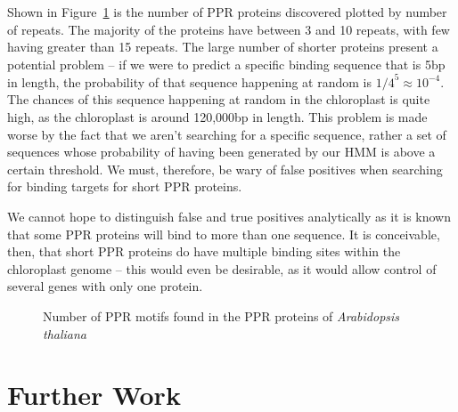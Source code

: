 \documentclass[twoside,a4paper]{article}
\begin{document}
\begin{multicols}{2}
Shown in Figure~\ref{fig:ppr} is the number of PPR proteins discovered plotted
by number of repeats.
The majority of the proteins have between 3 and 10 repeats, with few having
greater than 15 repeats.
The large number of shorter proteins present a potential problem -- if we were
to predict a specific binding sequence that is 5bp in length, the probability 
of that sequence happening at random is ${1/4}^5 \approx 10^{-4}$.
The chances of this sequence happening at random in the chloroplast is quite
high, as the chloroplast is around 120,000bp in length.
This problem is made worse by the fact that we aren't searching for a specific
sequence, rather a set of sequences whose probability of having been generated
by our HMM is above a certain threshold.
We must, therefore, be wary of false positives when searching for binding 
targets for short PPR proteins.

We cannot hope to distinguish false and true positives analytically as it is
known that some PPR proteins will bind to more than one
sequence\cite{Barkan2012}.
It is conceivable, then, that short PPR proteins do have multiple binding sites
within the chloroplast genome -- this would even be desirable, as it would
allow control of several genes with only one protein.

\begin{figure}[H]

  \caption{Number of PPR motifs found in the PPR proteins of
    \textit{Arabidopsis thaliana}}
  \label{fig:ppr}
\end{figure}

\section{Further Work}


\end{multicols}
\end{document}
